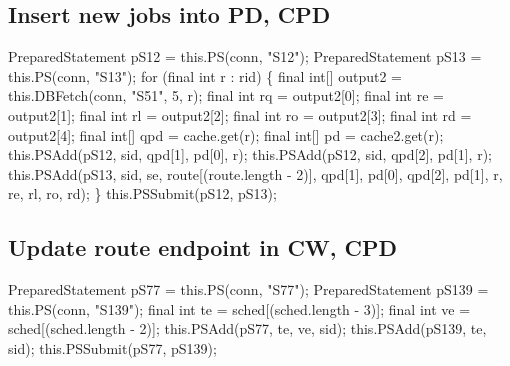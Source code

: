 \subsection{Insert new jobs into PD, CPD}
\nwenddocs{}\endmoddef{}
PreparedStatement pS12 = this.PS(conn, "S12");
PreparedStatement pS13 = this.PS(conn, "S13");
for (final int r : rid) \{
  final int[] output2 = this.DBFetch(conn, "S51", 5, r);
  final int rq = output2[0];
  final int re = output2[1];
  final int rl = output2[2];
  final int ro = output2[3];
  final int rd = output2[4];
  final int[] qpd = cache.get(r);
  final int[]  pd = cache2.get(r);
  this.PSAdd(pS12, sid, qpd[1], pd[0], r);
  this.PSAdd(pS12, sid, qpd[2], pd[1], r);
  this.PSAdd(pS13, sid, se, route[(route.length - 2)], qpd[1], pd[0], qpd[2], pd[1],
        r, re, rl, ro, rd);
\}
this.PSSubmit(pS12, pS13);
\nwendcode{}\nwdocspar

\subsection{Update route endpoint in CW, CPD}
\nwenddocs{}\endmoddef{}
PreparedStatement pS77 = this.PS(conn, "S77");
PreparedStatement pS139 = this.PS(conn, "S139");
final int te = sched[(sched.length - 3)];
final int ve = sched[(sched.length - 2)];
this.PSAdd(pS77, te, ve, sid);
this.PSAdd(pS139, te, sid);
this.PSSubmit(pS77, pS139);
\nwendcode{}\nwdocspar

